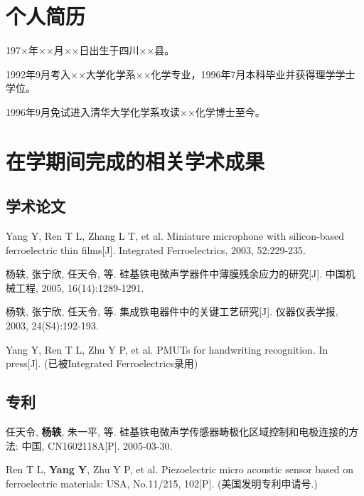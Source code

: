 \begin{resume}

  \section*{个人简历}

    197×年××月××日出生于四川××县。
    
    1992年9月考入××大学化学系××化学专业，1996年7月本科毕业并获得理学学士学位。
    
    1996年9月免试进入清华大学化学系攻读××化学博士至今。


  \section*{在学期间完成的相关学术成果}

  \subsection*{学术论文}

  \begin{achievements}
  
    \item Yang Y, Ren T L, Zhang L T, et al. Miniature microphone with silicon-based ferroelectric thin films[J]. Integrated Ferroelectrics, 2003, 52:229-235.
    \item 杨轶, 张宁欣, 任天令, 等. 硅基铁电微声学器件中薄膜残余应力的研究[J]. 中国机械工程, 2005, 16(14):1289-1291.
    \item 杨轶, 张宁欣, 任天令, 等. 集成铁电器件中的关键工艺研究[J]. 仪器仪表学报, 2003, 24(S4):192-193.
    \item Yang Y, Ren T L, Zhu Y P, et al. PMUTs for handwriting recognition. In press[J]. (已被Integrated Ferroelectrics录用)
    
  \end{achievements}


  \subsection*{专利}

  \begin{achievements}
  
    \item 任天令, \textbf{杨轶}, 朱一平, 等. 硅基铁电微声学传感器畴极化区域控制和电极连接的方法: 中国, CN1602118A[P]. 2005-03-30.
\item Ren T L, \textbf{Yang Y}, Zhu Y P, et al. Piezoelectric micro acoustic sensor based on ferroelectric materials: USA, No.11/215, 102[P]. (美国发明专利申请号.)

  \end{achievements}

\end{resume}
